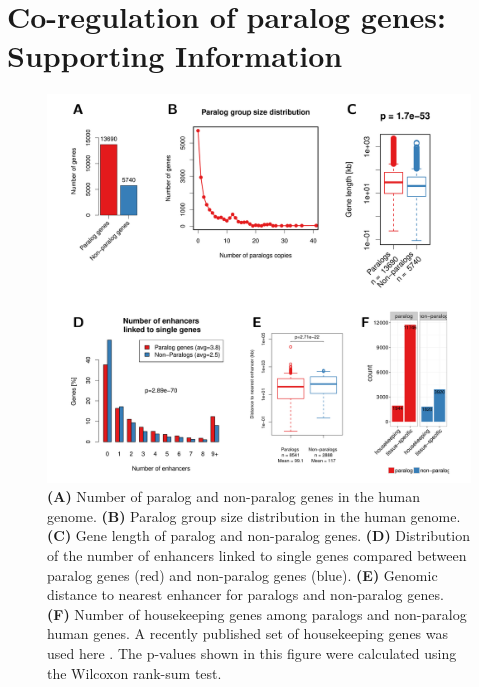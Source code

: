 \documentclass[a4paper,twoside=true,openright,parskip=full,chapterprefix=true,11pt,headings=normal,bibliography=totoc,listof=totoc,titlepage=on,captions=tableabove,draft=false]{scrreprt}
\theoremstyle{definition}
\theoremstyle{definition}
\theoremstyle{definition}
\theoremstyle{remark}
\begin{document}
\hypertarget{appendix-appendix}{%
\appendix}


\hypertarget{sup-paralog-regulation}{%
\chapter{Co-regulation of paralog genes: Supporting
Information}\label{sup-paralog-regulation}}

\begin{figure}

{\centering \includegraphics[width=0.8\linewidth]{figures/paralog/SI/figS1} 

}

\caption{\textbf{(A)} Number of paralog and non-paralog genes
in the human genome. \textbf{(B)} Paralog group size distribution in the
human genome. \textbf{(C)} Gene length of paralog and non-paralog genes.
\textbf{(D)} Distribution of the number of enhancers linked to single
genes compared between paralog genes (red) and non-paralog genes (blue).
\textbf{(E)} Genomic distance to nearest enhancer for paralogs and
non-paralog genes. \textbf{(F)} Number of housekeeping genes among
paralogs and non-paralog human genes. A recently published set of
housekeeping genes was used here \citep{Eisenberg2013}. The p-values
shown in this figure were calculated using the Wilcoxon rank-sum test.}\label{fig:paraVSnonPara}
\end{figure}
\end{document}
